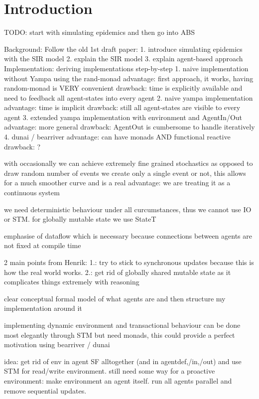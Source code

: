 \section{Introduction}
TODO: start with simulating epidemics and then go into ABS

Background: Follow the old 1st draft paper:
1. introduce simulating epidemics with the SIR model
2. explain the SIR model 
3. explain agent-based approach 
Implementation: deriving implementations step-by-step 
1. naive implementation without Yampa using the rand-monad 
	advantage: 	first approach, it works, having random-monad is VERY convenient
	drawback: 	time is explicitly available and need to feedback all agent-states into every agent
2. naive yampa implementation
	advantage:	time is implicit
	drawback:	still all agent-states are visible to every agent
3. extended yampa implementation with environment and AgentIn/Out
	advantage:	more general
	drawback:	AgentOut is cumbersome to handle iteratively
4. dunai / bearriver
	advantage:	can have monads AND functional reactive 
	drawback:	?
	
with occasionally we can achieve extremely fine grained stochastics as opposed to draw random number of events we create only a single event or not, this allows for a much smoother curve and is a real advantage: we are treating it as a continuous system

we need deterministic behaviour under all curcumstances, thus we cannot use IO or STM. for globally mutable state we use StateT

emphasise of dataflow which is necessary because connections between agents are not fixed at compile time

2 main points from Henrik: 1.: try to stick to synchronous updates because this is how the real world works. 2.: get rid of globally shared mutable state as it complicates things extremely with reasoning

clear conceptual formal model of what agents are and then structure my implementation around it

implementing dynamic environment and transactional behaviour can be done most elegantly through STM but need monads, this could provide a perfect motivation using bearriver / dunai 

idea: get rid of env in agent SF alltogether (and in agentdef,/in,/out) and use STM for read/write environment. still need some way for a proactive environment: make environment an agent itself. run all agents parallel and remove sequential updates.

